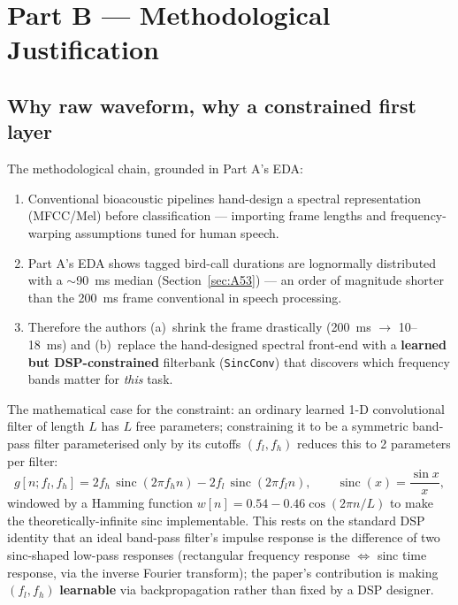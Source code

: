 \documentclass[11pt]{article}
\begin{document}
\section{Part B --- Methodological Justification}

\subsection{Why raw waveform, why a constrained first layer}
\label{sec:B1}

The methodological chain, grounded in Part A's EDA:

\begin{enumerate}[nosep]
\item Conventional bioacoustic pipelines hand-design a spectral
  representation (MFCC/Mel) before classification --- importing frame
  lengths and frequency-warping assumptions tuned for human speech.
\item Part A's EDA shows tagged bird-call durations are lognormally
  distributed with a $\sim$90~ms median (Section~\ref{sec:A53}) --- an order
  of magnitude shorter than the 200~ms frame conventional in speech
  processing.
\item Therefore the authors (a)~shrink the frame drastically (200~ms
  $\to$ 10--18~ms) and (b)~replace the hand-designed spectral front-end with
  a \textbf{learned but DSP-constrained} filterbank (\texttt{SincConv}) that
  discovers which frequency bands matter for \emph{this} task.
\end{enumerate}

The mathematical case for the constraint: an ordinary learned 1-D
convolutional filter of length $L$ has $L$ free parameters; constraining it
to be a symmetric band-pass filter parameterised only by its cutoffs
$(f_l,f_h)$ reduces this to 2 parameters per filter:
\[
g[n; f_l, f_h] = 2f_h\,\operatorname{sinc}(2\pi f_h n) - 2f_l\,\operatorname{sinc}(2\pi f_l n),
\qquad \operatorname{sinc}(x)=\frac{\sin x}{x},
\]
windowed by a Hamming function $w[n]=0.54-0.46\cos(2\pi n/L)$ to make the
theoretically-infinite sinc implementable. This rests on the standard DSP
identity that an ideal band-pass filter's impulse response is the
difference of two sinc-shaped low-pass responses (rectangular frequency
response $\Leftrightarrow$ sinc time response, via the inverse Fourier
transform); the paper's contribution is making $(f_l,f_h)$
\textbf{learnable} via backpropagation rather than fixed by a DSP designer.
\end{document}
